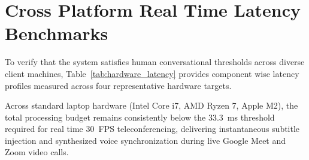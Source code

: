 \documentclass[10pt,conference]{IEEEtran}
\begin{document}
\section{Cross Platform Real Time Latency Benchmarks}

To verify that the system satisfies human conversational thresholds across diverse client machines, Table~\ref{tab:hardware_latency} provides component wise latency profiles measured across four representative hardware targets.

\begin{table}[!htbp]
\centering
\caption{Cross Platform Latency Profiling across Hardware Targets}
\label{tab:hardware_latency}
\end{table}

Across standard laptop hardware (Intel Core i7, AMD Ryzen 7, Apple M2), the total processing budget remains consistently below the 33.3~ms threshold required for real time 30~FPS teleconferencing, delivering instantaneous subtitle injection and synthesized voice synchronization during live Google Meet and Zoom video calls.
\end{document}
